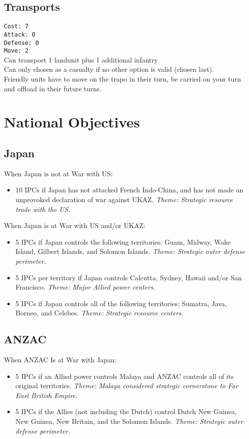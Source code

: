 \documentclass[10pt,twoside]{article}
\begin{document}
\begin{multicols*}{3}
\subsection*{Transports}
\texttt{Cost: 7 \\ Attack: 0 \\ Defense: 0 \\ Move: 2}
\\
Can transport 1 landunit plus 1 additional infantry\\
Can only chosen as a casualty if no other option is valid (\glqq chosen last\grqq).\\
Friendly units have to move on the trapo in their turn, be carried on your turn and offload in their future turns.

\section*{National Objectives}
\subsection*{Japan}
When Japan is not at War with US:
\begin{itemize}
\item 10 IPCs if Japan has not attacked French Indo-China, and has not made an unprovoked declaration of war against UKAZ. \textsl{Theme: Strategic resource trade with the US.}
\end{itemize}
When Japan is at War with US and/or UKAZ:
\begin{itemize}
\item 5 IPCs if Japan controls the following territories: Guam, Midway, Wake Island, Gilbert Islands, and Solomon Islands. \textsl{Theme: Strategic outer defense perimeter.}
\item 5 IPCs per territory if Japan controls Calcutta, Sydney, Hawaii and/or San Francisco. \textsl{Theme: Major Allied power centers.}
\item 5 IPCs if Japan controls all of the following territories: Sumatra, Java, Borneo, and Celebes. \textsl{Theme: Strategic resource centers.}
\end{itemize}

\subsection*{ANZAC}
When ANZAC Is at War with Japan:
\begin{itemize}
\item 5 IPCs if an Allied power controls Malaya and ANZAC controls all of its original territories. \textsl{Theme: Malaya considered strategic cornerstone to Far East British Empire.}
\item 5 IPCs if the Allies (not including the Dutch) control Dutch New Guinea, New Guinea, New Britain, and the Solomon Islands. \textsl{Theme: Strategic outer defense perimeter.}
\end{itemize}


\end{multicols*}
\end{document}
